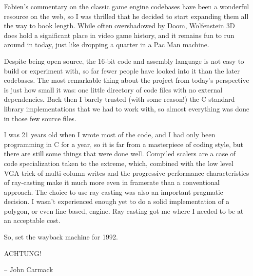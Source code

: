 Fabien's commentary on the classic game engine codebases have been a wonderful resource on the web, so I was thrilled that he decided to start expanding them all the way to book length. While often overshadowed by Doom, Wolfenstein 3D does hold a significant place in video game history, and it remains fun to run around in today, just like dropping a quarter in a Pac Man machine.\\
\par
 Despite being open source, the 16-bit code and assembly language is not easy to build or experiment with, so far fewer people have looked into it than the later codebases. The most remarkable thing about the project from today's perspective is just how small it was: one little directory of code files with no external dependencies.  Back then I barely trusted (with some reason!) the C standard library implementations that we had to work with, so almost everything was done in those few source files.\\
\par
I was 21 years old when I wrote most of the code, and I had only been programming in C for a year, so it is far from a masterpiece of coding style, but there are still some things that were done well. Compiled scalers are a case of code specialization taken to the extreme, which, combined with the low level VGA trick of multi-column writes and the progressive performance characteristics of ray-casting make it much more even in framerate than a conventional approach. The choice to use ray casting was also an important pragmatic decision.  I wasn't experienced enough yet to do a solid implementation of a polygon, or even line-based, engine.  Ray-casting got me where I needed to be at an acceptable cost.\\
\par 
So, set the wayback machine for 1992.\\
\par
ACHTUNG!\\
\par
-- John Carmack
